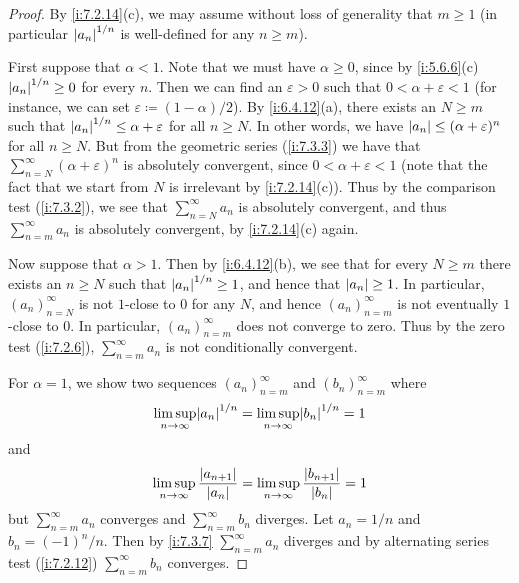 \begin{proof}
  By \cref{i:7.2.14}(c), we may assume without loss of generality that \(m \geq 1\)
  (in particular \(\left\lvert a_n\right\rvert^{1 / n}\) is well-defined for any \(n \geq m\)).

  First suppose that \(\alpha < 1\).
  Note that we must have \(\alpha \geq 0\), since by \cref{i:5.6.6}(c) \(\left\lvert a_n\right\rvert^{1 / n} \geq 0\) for every \(n\).
  Then we can find an \(\varepsilon > 0\) such that \(0 < \alpha + \varepsilon < 1\) (for instance, we can set \(\varepsilon \coloneqq (1 - \alpha) / 2\)).
  By \cref{i:6.4.12}(a), there exists an \(N \geq m\) such that \(\left\lvert a_n\right\rvert^{1 / n} \leq \alpha + \varepsilon\) for all \(n \geq N\).
  In other words, we have \(\left\lvert a_n\right\rvert \leq (\alpha + \varepsilon)^n\) for all \(n \geq N\).
  But from the geometric series (\cref{i:7.3.3}) we have that \(\sum_{n = N}^\infty (\alpha + \varepsilon)^n\) is absolutely convergent, since \(0 < \alpha + \varepsilon < 1\)
  (note that the fact that we start from \(N\) is irrelevant by \cref{i:7.2.14}(c)).
  Thus by the comparison test (\cref{i:7.3.2}), we see that \(\sum_{n = N}^\infty a_n\) is absolutely convergent, and thus \(\sum_{n = m}^\infty a_n\) is absolutely convergent, by \cref{i:7.2.14}(c) again.

  Now suppose that \(\alpha > 1\).
  Then by \cref{i:6.4.12}(b), we see that for every \(N \geq m\) there exists an \(n \geq N\) such that \(\left\lvert a_n\right\rvert^{1 / n} \geq 1\), and hence that \(\left\lvert a_n\right\rvert \geq 1\).
  In particular, \((a_n)_{n = N}^\infty\) is not \(1\)-close to \(0\) for any \(N\), and hence \((a_n)_{n = m}^\infty\) is not eventually \(1\)-close to \(0\).
  In particular, \((a_n)_{n = m}^\infty\) does not converge to zero.
  Thus by the zero test (\cref{i:7.2.6}), \(\sum_{n = m}^\infty a_n\) is not conditionally convergent.

  For \(\alpha = 1\), we show two sequences \((a_n)_{n = m}^\infty\) and \((b_n)_{n = m}^\infty\) where
  \[
    \limsup_{n \to \infty} \abs{a_n}^{1 / n} = \limsup_{n \to \infty} \abs{b_n}^{1 / n} = 1
  \]
  and
  \[
    \limsup_{n \to \infty} \dfrac{\left\lvert a_{n + 1}\right\rvert}{\left\lvert a_n\right\rvert} = \limsup_{n \to \infty} \dfrac{\left\lvert b_{n + 1}\right\rvert}{\left\lvert b_n\right\rvert} = 1
  \]
  but \(\sum_{n = m}^\infty a_n\) converges and \(\sum_{n = m}^\infty b_n\) diverges.
  Let \(a_n = 1 / n\) and \(b_n = (-1)^n / n\).
  Then by \cref{i:7.3.7} \(\sum_{n = m}^\infty a_n\) diverges and by alternating series test (\cref{i:7.2.12}) \(\sum_{n = m}^\infty b_n\) converges.


\end{proof}
